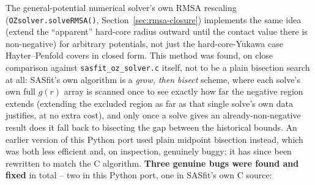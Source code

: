 \documentclass[11pt,a4paper]{article}
\newcommand{\code}[1]{\texttt{#1}}
\begin{document}
The general-potential numerical solver's own RMSA rescaling
(\code{OZsolver.solveRMSA()}, Section~\ref{sec:rmsa-closure}) implements the
same idea (extend the ``apparent'' hard-core radius outward until the contact
value there is non-negative) for arbitrary potentials, not just the
hard-core-Yukawa case Hayter--Penfold covers in closed form. This method was
found, on close comparison against \code{sasfit\_oz\_solver.c} itself, not to
be a plain bisection search at all: SASfit's own algorithm is a \emph{grow,
then bisect} scheme, where each solve's own full $g(r)$ array is scanned once
to see exactly how far the negative region extends (extending the excluded
region as far as that single solve's own data justifies, at no extra cost),
and only once a solve gives an already-non-negative result does it fall back
to bisecting the gap between the historical bounds. An earlier version of
this Python port used plain midpoint bisection instead, which was both less
efficient and, on inspection, genuinely buggy; it has since been rewritten to
match the C algorithm. \textbf{Three genuine bugs were found and fixed} in
total -- two in this Python port, one in SASfit's own C source:
\end{document}
